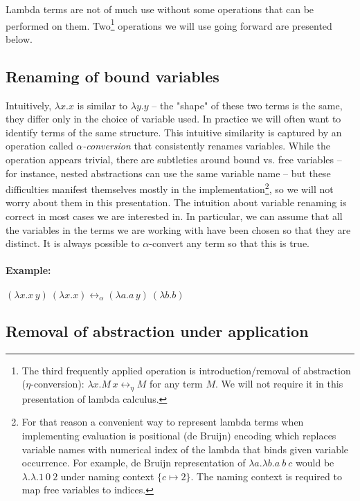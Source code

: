 \documentclass[11pt,twoside,a4paper]{article} %
\begin{document}
Lambda terms are not of much use without some operations that can be performed
on them. Two\footnote{The third frequently applied operation is introduction/removal 
of abstraction ($\eta$-conversion): $\lambda x.M\,x\longleftrightarrow_\eta M$ for 
any term $M$. We will not require it in this presentation of lambda calculus.} 
operations we will use going forward are presented below.

\subsection{Renaming of bound variables}

Intuitively, $\lambda x.x$ is similar to $\lambda y.y$ -- the "shape" of these
two terms is the same, they differ only in the choice of variable used. In 
practice we will often want to identify terms of the same structure. 
This intuitive similarity is captured by an operation called 
\emph{$\alpha$-conversion} that consistently renames variables. While the
operation appears trivial, there are subtleties around bound vs. free
variables -- for instance, nested abstractions can use the same variable name
-- but these difficulties manifest themselves mostly in the
implementation\footnote{For that reason a convenient way to represent 
lambda terms when implementing evaluation is positional (de Bruijn) encoding
which replaces variable names with numerical index of the lambda that binds given 
variable occurrence. For example, de Bruijn representation of 
$\lambda a.\lambda b.a\ b\ c$  would be $\lambda.\lambda.1\ 0\ 2$ under naming 
context $\{c\mapsto 2\}$.  The naming context is required to map free variables 
to indices.}, so we will not worry about them in this presentation. The intuition 
about variable renaming is correct in most cases we are interested in. In 
particular, we can assume that all the variables in the terms we are working 
with have been chosen so that they are distinct. It is always possible to 
$\alpha$-convert any term so that this is true.
\paragraph{Example:} $(\lambda x.x\,y)\ (\lambda x.x)\longleftrightarrow_\alpha(\lambda
a.a\,y)\ (\lambda b.b)$

\subsection{Removal of abstraction under application}\label{beta-reduction}
\end{document}

